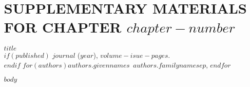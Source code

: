 \graphicspath{{chapter$chapter-number$/}{manuscript/}}

\chapter{\textbf{SUPPLEMENTARY MATERIALS FOR CHAPTER $chapter-number$}}

\begin{center}
\textbf{$title$} \\
$if(published)$
\textit{$journal$} ($year$), $volume-isue-pages$. \\
$endif$
$for(authors)$$authors.givennames$~$authors.familyname$$sep$, $endfor$
\end{center}

$body$

\newpage
